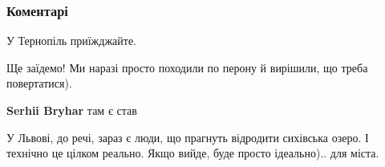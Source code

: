  
 
 
 
 
\subsubsection{Коментарі}

\begin{itemize}
 
У Тернопіль приїжджайте.

\begin{itemize}
 
Ще заїдемо! Ми наразі просто походили по перону й вирішили, що треба повертатися).

 
\textbf{Serhii Bryhar} там є став \Smiley[1.0][yellow]

 

У Львові, до речі, зараз є люди, що прагнуть відродити сихівська озеро. І
технічно це цілком реально. Якщо вийде, буде просто ідеально).. для міста.


 

\end{itemize}
\end{itemize}
